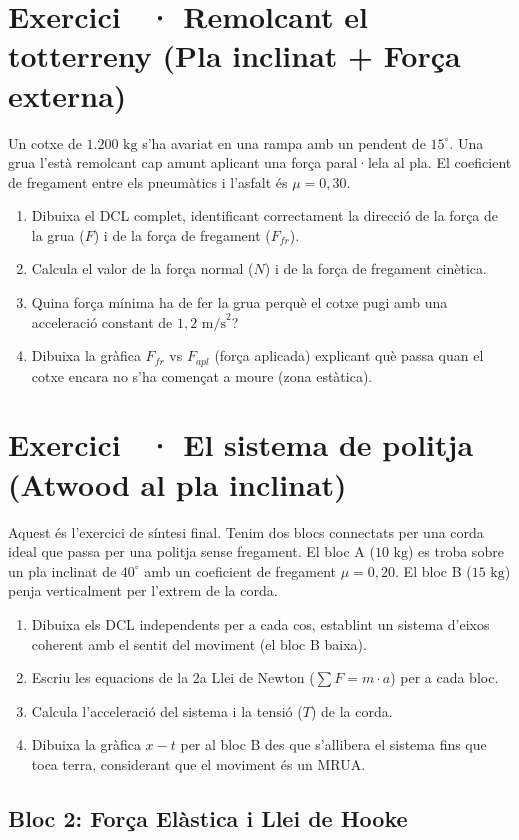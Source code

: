 \documentclass[12pt,a4paper,twoside]{article}
\newcounter{exercici}
\newcommand{\exercici}[1]{%
  \stepcounter{exercici}
  \section*{Exercici \theexercici\ \textnormal{· #1}}
  \vspace{-10pt}
}
\begin{document}
\vspace{0.5cm}
\exercici{Remolcant el totterreny (Pla inclinat + Força externa)}
Un cotxe de $1.200 \text{ kg}$ s'ha avariat en una rampa amb un pendent de $15^\circ$. Una grua l'està remolcant cap amunt aplicant una força paral·lela al pla. El coeficient de fregament entre els pneumàtics i l'asfalt és $\mu = 0{,}30$.
\begin{enumerate}[label=\textbf{\alph*)}]
  \item Dibuixa el DCL complet, identificant correctament la direcció de la força de la grua ($F$) i de la força de fregament ($F_{fr}$).
  \item Calcula el valor de la força normal ($N$) i de la força de fregament cinètica.
  \item Quina força mínima ha de fer la grua perquè el cotxe pugi amb una acceleració constant de $1{,}2 \text{ m/s}^2$?
  \item Dibuixa la gràfica $F_{fr}$ vs $F_{apl}$ (força aplicada) explicant què passa quan el cotxe encara no s'ha començat a moure (zona estàtica).
\end{enumerate}

\vspace{0.5cm}
\exercici{El sistema de politja (Atwood al pla inclinat)}
Aquest és l'exercici de síntesi final. Tenim dos blocs connectats per una corda ideal que passa per una politja sense fregament. El bloc A ($10 \text{ kg}$) es troba sobre un pla inclinat de $40^\circ$ amb un coeficient de fregament $\mu = 0{,}20$. El bloc B ($15 \text{ kg}$) penja verticalment per l'extrem de la corda.
\begin{enumerate}[label=\textbf{\alph*)}]
  \item Dibuixa els DCL independents per a cada cos, establint un sistema d'eixos coherent amb el sentit del moviment (el bloc B baixa).
  \item Escriu les equacions de la 2a Llei de Newton ($\sum F = m \cdot a$) per a cada bloc.
  \item Calcula l'acceleració del sistema i la tensió ($T$) de la corda.
  \item Dibuixa la gràfica $x-t$ per al bloc B des que s'allibera el sistema fins que toca terra, considerant que el moviment és un MRUA.
\end{enumerate}

\clearpage


\vspace{0.5cm}
\subsection*{Bloc 2: Força Elàstica i Llei de Hooke}
\end{document}
